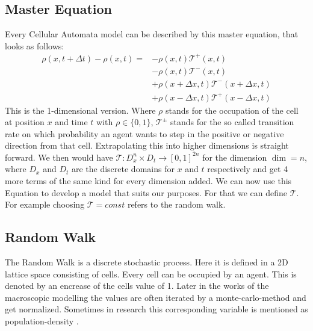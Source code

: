 \subsection{Master Equation}
Every Cellular Automata model can be described by this master equation, that looks as follows: 
\begin{equation}
   \label{eq:eq1}
   \begin{split}
   \rho(x,t+\Delta t) - \rho(x,t)  = & - \rho(x,t)\mathcal{T}^{+}(x,t) 
   \\ & - \rho(x,t)\mathcal{T}^{-}(x,t) 
   \\ & + \rho(x +\Delta x,t)\mathcal{T}^{-}(x + \Delta x,t)
   \\ & + \rho(x -\Delta x,t)\mathcal{T}^{+}(x - \Delta x,t) 
   \end{split}
\end{equation}
This is the 1-dimensional version. Where $\rho$ stands for the occupation of the cell at position $ x $ and time $ t $ with $\rho \in \{0,1\} $, 
$ \mathcal{T}^{\pm}$ stands for the so called transition rate on which probability an agent wants to step in the positive or negative direction from that cell.
Extrapolating this into higher dimensions is straight forward. We then would have $ \mathcal{T}: D_x^{n}\times D_t \to [0,1]^{2n} $ for the dimension $\dim = n$, 
where $D_x$ and $D_t$ are the discrete domains for $x$ and $t$ respectively and get 4 more terms of the same kind for every dimension added. 
We can now use this Equation to develop a model that suits our purposes. 
For that we can define $ \mathcal{T} $. For example choosing $ \mathcal{T} = const$ refers to the random walk. 


\subsection{Random Walk}
The Random Walk is a discrete stochastic process. Here it is defined in a 2D lattice space consisting of cells. Every cell can be occupied by an agent. 
This is denoted by an encrease of the cells value of 1. 
Later in the works of the macroscopic modelling the values are often iterated by a monte-carlo-method and get normalized. 
Sometimes in research this corresponding variable is mentioned as population-density \cite{Michi}.

